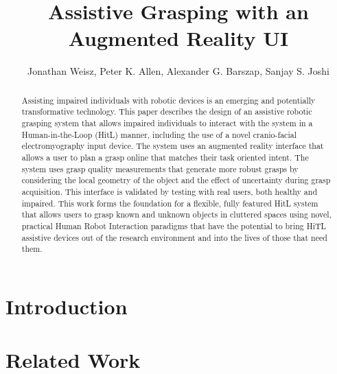 \documentclass[shortAfour,sageh,times]{sagej}
\begin{document}

\title{Assistive Grasping with an Augmented Reality UI}

 \author{Jonathan Weisz, Peter K. Allen, Alexander G. Barszap, Sanjay S. Joshi}


\begin{abstract}
Assisting impaired individuals with robotic devices is an emerging and potentially transformative technology.  This paper describes the design of an assistive robotic grasping system that allows impaired individuals to interact with the system in a Human-in-the-Loop (HitL) manner, including the use of a novel cranio-facial electromyography input device. The system uses an augmented reality interface that allows a user to plan a grasp online that matches their task oriented intent. The system uses grasp quality measurements that generate more robust grasps by considering the local geometry of the object and the effect of uncertainty during grasp acquisition. This interface is validated by testing with real users, both healthy and impaired. This work forms the foundation for a flexible, fully featured HitL system that allows users to grasp known and unknown objects in cluttered spaces using novel, practical Human Robot Interaction paradigms that have the potential to bring HiTL assistive devices out of the research environment and into the lives of those that need them. 
\end{abstract}


\maketitle


\section{Introduction}


\section{Related Work}















\end{document}
